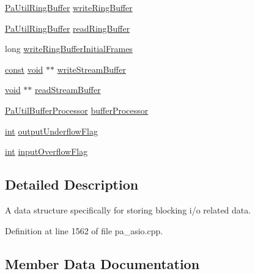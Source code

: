 \begin{DoxyCompactItemize}
\hyperlink{struct_pa_util_ring_buffer}{Pa\+Util\+Ring\+Buffer} \hyperlink{struct_pa_asio_stream_blocking_state_ab9875e6148cce05acff1774e0cbb4bd5}{write\+Ring\+Buffer}
\item 
\hyperlink{struct_pa_util_ring_buffer}{Pa\+Util\+Ring\+Buffer} \hyperlink{struct_pa_asio_stream_blocking_state_a5ae8106505c2ad1fd79f03274071ad1b}{read\+Ring\+Buffer}
\item 
long \hyperlink{struct_pa_asio_stream_blocking_state_a3367c2abcf6ecd151b370b80e196a0fe}{write\+Ring\+Buffer\+Initial\+Frames}
\item 
\hyperlink{getopt1_8c_a2c212835823e3c54a8ab6d95c652660e}{const} \hyperlink{sound_8c_ae35f5844602719cf66324f4de2a658b3}{void} $\ast$$\ast$ \hyperlink{struct_pa_asio_stream_blocking_state_adbca9a38efb53888c4d0578125058a2e}{write\+Stream\+Buffer}
\item 
\hyperlink{sound_8c_ae35f5844602719cf66324f4de2a658b3}{void} $\ast$$\ast$ \hyperlink{struct_pa_asio_stream_blocking_state_a6c1cd19d9bee99ff976b75877cfb566f}{read\+Stream\+Buffer}
\item 
\hyperlink{struct_pa_util_buffer_processor}{Pa\+Util\+Buffer\+Processor} \hyperlink{struct_pa_asio_stream_blocking_state_af8989602749763446edf9eeb34975ada}{buffer\+Processor}
\item 
\hyperlink{xmltok_8h_a5a0d4a5641ce434f1d23533f2b2e6653}{int} \hyperlink{struct_pa_asio_stream_blocking_state_a3a15447e096a4c7d08b970351894ba3c}{output\+Underflow\+Flag}
\item 
\hyperlink{xmltok_8h_a5a0d4a5641ce434f1d23533f2b2e6653}{int} \hyperlink{struct_pa_asio_stream_blocking_state_a601d69041f7e015cb337591afd59319b}{input\+Overflow\+Flag}
\end{DoxyCompactItemize}


\subsection{Detailed Description}
A data structure specifically for storing blocking i/o related data. 

Definition at line 1562 of file pa\+\_\+asio.\+cpp.



\subsection{Member Data Documentation}
